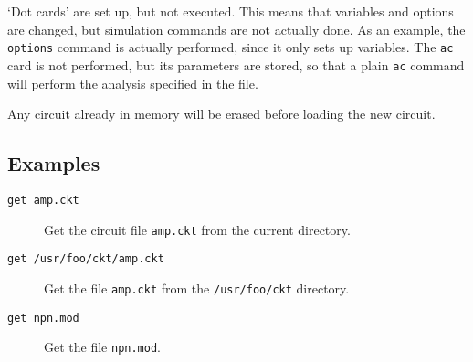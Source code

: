 `Dot cards' are set up, but not executed.  This means that variables and
options are changed, but simulation commands are not actually done.  As
an example, the {\tt options} command is actually performed, since it only
sets up variables.  The {\tt ac} card is not performed, but its parameters
are stored, so that a plain {\tt ac} command will perform the analysis
specified in the file.

Any circuit already in memory will be erased before loading the new circuit.
\subsection{Examples}

\begin{description}

\item[{\tt get amp.ckt}] Get the circuit file {\tt amp.ckt} from
the current directory.

\item[{\tt get /usr/foo/ckt/amp.ckt}] Get the file {\tt amp.ckt}
from the {\tt /usr/foo/ckt} directory.

\item[{\tt get npn.mod}] Get the file {\tt npn.mod}.
\end{description}
